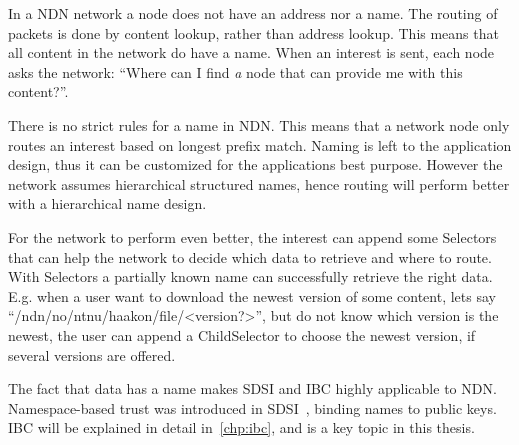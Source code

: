 In a \gls{NDN} network a \gls{node} does not have an address nor a \gls{name}.
The routing of packets is done by content lookup, rather than address lookup.
This means that all content in the network do have a \gls{name}.
When an \gls{interest} is sent, each \gls{node} asks the network: ``Where can I find \textit{a} node that can provide me with this content?''.

There is no strict rules for a \gls{name} in \gls{NDN}.
This means that a network \gls{node} only routes an \gls{interest} based on longest prefix match.
Naming is left to the application design, thus it can be customized for the applications best purpose.
However the network assumes hierarchical structured names, hence routing will perform better with a hierarchical \gls{name} design.

For the network to perform even better, the \gls{interest} can append some Selectors that can help the network to decide which \gls{data} to retrieve and where to route.
With Selectors a partially known \gls{name} can successfully retrieve the right \gls{data}.
E.g. when a user want to download the newest version of some content, lets say ``/ndn/no/ntnu/haakon/file/<version?>'', but do not know which version is the newest, the user can append a ChildSelector to choose the newest version, if several versions are offered.

The fact that \gls{data} has a \gls{name} makes \gls{SDSI} and \gls{IBC} highly applicable to \gls{NDN}.
Namespace-based trust was introduced in \gls{SDSI}~\cite{rivest1996sdsi}, binding names to public keys.
\gls{IBC} will be explained in detail in~\autoref{chp:ibc}, and is a key topic in this thesis.

